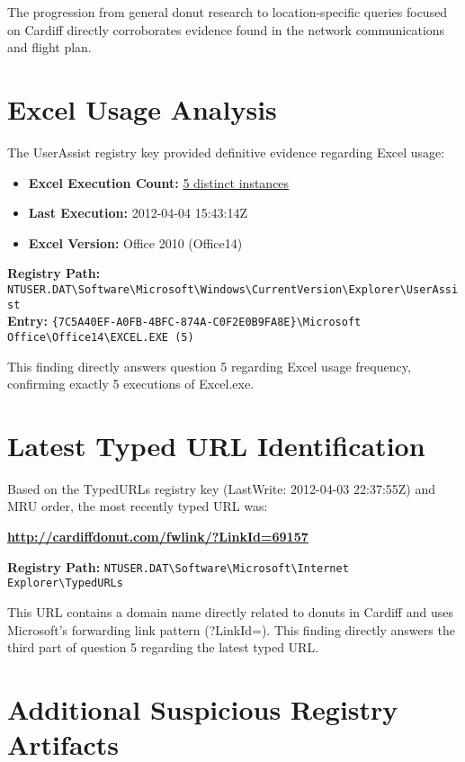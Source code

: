 The progression from general donut research to location-specific queries focused on Cardiff directly corroborates evidence found in the network communications and flight plan.

\section{Excel Usage Analysis}
The UserAssist registry key provided definitive evidence regarding Excel usage:

\begin{itemize}
    \item \textbf{Excel Execution Count:} \underline{5 distinct instances}
    \item \textbf{Last Execution:} 2012-04-04 15:43:14Z
    \item \textbf{Excel Version:} Office 2010 (Office14)
\end{itemize}

\textbf{Registry Path:} \texttt{NTUSER.DAT\textbackslash Software\textbackslash Microsoft\textbackslash Windows\textbackslash CurrentVersion\textbackslash Explorer\textbackslash UserAssist}\\
\textbf{Entry:} \texttt{\{7C5A40EF-A0FB-4BFC-874A-C0F2E0B9FA8E\}\textbackslash Microsoft Office\textbackslash Office14\textbackslash EXCEL.EXE (5)}

This finding directly answers question 5 regarding Excel usage frequency, confirming exactly 5 executions of Excel.exe.

\section{Latest Typed URL Identification}
Based on the TypedURLs registry key (LastWrite: 2012-04-03 22:37:55Z) and MRU order, the most recently typed URL was:

\begin{center}
\textbf{\url{http://cardiffdonut.com/fwlink/?LinkId=69157}}
\end{center}

\textbf{Registry Path:} \texttt{NTUSER.DAT\textbackslash Software\textbackslash Microsoft\textbackslash Internet Explorer\textbackslash TypedURLs}

This URL contains a domain name directly related to donuts in Cardiff and uses Microsoft's forwarding link pattern (?LinkId=). This finding directly answers the third part of question 5 regarding the latest typed URL.

\section{Additional Suspicious Registry Artifacts}

